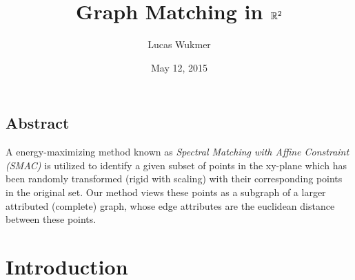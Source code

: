 \documentclass[10pt,twocolumn]{article}
\title{Graph Matching in $\mathbb{R}^2$}
\author{Lucas Wukmer}
\date{May 12, 2015}
\begin{document}
\maketitle

\subsection*{Abstract}

A energy-maximizing method known as \emph{Spectral
Matching with Affine Constraint (SMAC)}  is utilized to identify a given subset
of points in the xy-plane which has been randomly transformed (rigid with
scaling) with their corresponding points in the original set. Our method views
these points as a subgraph of a larger attributed (complete) graph, whose edge
attributes are the euclidean distance between these points. 

\section{Introduction}
\end{document}
